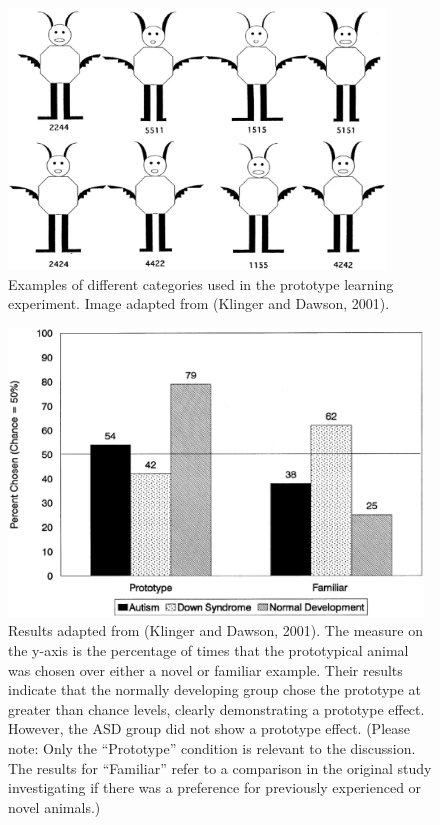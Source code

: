 \begin{figure}[ht]
\begin{center}
	\includegraphics[width=100mm]{figures/mip_familiarization.eps}
\end{center}
\caption{Examples of different categories used in the prototype learning experiment.  Image adapted from (Klinger and Dawson, 2001).}
\label{mip-familiarization}
\end{figure} 

\begin{figure}[ht]
\begin{center}
	\includegraphics[width=110mm]{figures/klinger_results.eps}
\end{center}
\caption{Results adapted from (Klinger and Dawson, 2001).  The measure on the y-axis is the percentage of times that the prototypical animal was chosen over either a novel or familiar example. Their results indicate that the normally developing group chose the prototype at greater than chance levels, clearly demonstrating a prototype effect.  However, the ASD group did not show a prototype effect. (Please note: Only the ``Prototype'' condition is relevant to the discussion.  The results for ``Familiar'' refer to a comparison in the original study investigating if there was a preference for previously experienced or novel animals.)}
\label{klinger_results}
\end{figure} 

